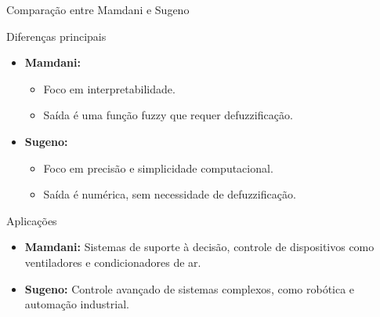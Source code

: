 \documentclass[aspectratio=169]{beamer}
\begin{document}
\begin{frame}{Comparação entre Mamdani e Sugeno}
    \begin{block}{Diferenças principais}
        \begin{itemize}
            \item \textbf{Mamdani:}
                \begin{itemize}
                    \item Foco em interpretabilidade.
                    \item Saída é uma função fuzzy que requer defuzzificação.
                \end{itemize}
            \item \textbf{Sugeno:}
                \begin{itemize}
                    \item Foco em precisão e simplicidade computacional.
                    \item Saída é numérica, sem necessidade de defuzzificação.
                \end{itemize}
        \end{itemize}
    \end{block}
    \begin{block}{Aplicações}
        \begin{itemize}
            \item \textbf{Mamdani:} Sistemas de suporte à decisão, controle de dispositivos como ventiladores e condicionadores de ar.
            \item \textbf{Sugeno:} Controle avançado de sistemas complexos, como robótica e automação industrial.
        \end{itemize}
    \end{block}
\end{frame}
\end{document}
